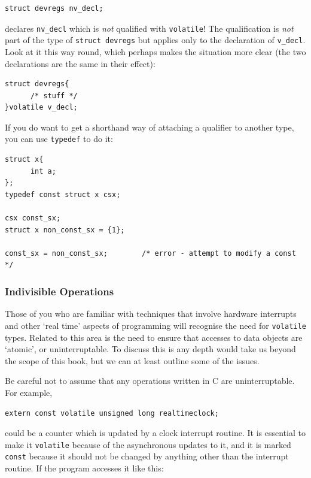 \begin{Verbatim}
struct devregs nv_decl;
\end{Verbatim}

   declares \texttt{nv\_decl} which is \textit{not} qualified with
    \texttt{volatile}! The qualification is \textit{not} part of the
    type of \texttt{struct devregs} but applies only to the declaration
    of \texttt{v\_decl}. Look at it this way round, which perhaps makes
    the situation more clear (the two declarations are the same in their
    effect):


\begin{Verbatim}
struct devregs{
      /* stuff */
}volatile v_decl;
\end{Verbatim}

   If you do want to get a shorthand way of attaching a qualifier to
    another type, you can use \texttt{typedef} to do it:


\begin{Verbatim}
struct x{
      int a;
};
typedef const struct x csx;

csx const_sx;
struct x non_const_sx = {1};

const_sx = non_const_sx;        /* error - attempt to modify a const */
\end{Verbatim}

   \subsubsection{Indivisible Operations}
    

    Those of you who are familiar with techniques that involve hardware
     interrupts and other `real time' aspects of programming will
     recognise the need for \texttt{volatile} types. Related to this
     area is the need to ensure that accesses to data objects are
     `atomic', or uninterruptable. To discuss this is any depth would
     take us beyond the scope of this book, but we can at least outline some
     of the issues.


    Be careful not to assume that any operations written in C are
     uninterruptable. For example,


\begin{Verbatim}
extern const volatile unsigned long realtimeclock;
\end{Verbatim}

    could be a counter which is updated by a clock interrupt routine. It
     is essential to make it \texttt{volatile} because of the
     asynchronous updates to it, and it is marked \texttt{const} because
     it should not be changed by anything other than the interrupt routine.
     If the program accesses it like this:


